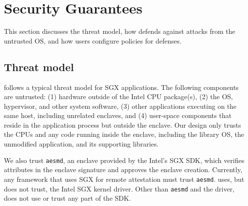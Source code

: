 \section{Security Guarantees}
\label{sec:sgx:security}

This section discusses the threat model,
how \graphenesgx{} defends against attacks from the untrusted OS,
and how users configure policies for defenses.


\subsection{Threat model}
\label{sec:sgx:overview:threat}

\graphenesgx{} follows a typical threat model for SGX applications.
The following components are untrusted:
(1) hardware outside of the Intel CPU package(s),
(2) the OS, hypervisor, and other system software,
(3) other applications executing on the same host, including unrelated enclaves,
and (4) user-space components that
reside in the application process but outside the enclave.
Our design only trusts the CPUs and any code running inside the enclave, including the library OS, the unmodified application, and its supporting libraries. 

We also trust {\tt aesmd}, an enclave provided by the Intel's SGX SDK, which verifies
attributes in the enclave signature and approves the enclave creation.
Currently, any framework that uses SGX for remote attestation must trust {\tt aesmd}.
\graphenesgx{} uses, but does not trust, the Intel SGX kernel driver.
Other than {\tt aesmd} and the driver, \graphenesgx{} does not use or trust any part of the SDK.

